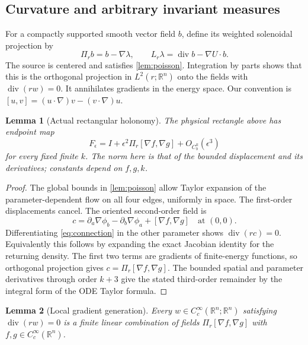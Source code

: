 \documentclass[11pt]{article}
\numberwithin{equation}{section}
\newtheorem{lemma}[lemma]{Lemma}
\theoremstyle{definition}
\newcommand{\R}{\mathbb R}
\newcommand{\Cc}{C_c^\infty}
\newcommand{\diver}{\operatorname{div}}
\begin{document}
\subsection{Curvature and arbitrary invariant measures}

For a compactly supported smooth vector field $b$, define its
weighted solenoidal projection by
\begin{equation}\label{eq:projection}
 \Pi_r b=b-\nabla\lambda,\qquad
 L_r\lambda=\diver b-\nabla U\cdot b .
\end{equation}
The source is centered and satisfies \cref{lem:poisson}.
Integration by parts shows that this is the orthogonal projection
in $L^2(r;\R^n)$ onto the fields with $\diver(rw)=0$.
It annihilates gradients in the energy space.
Our convention is $[u,v]=(u\cdot\nabla)v-(v\cdot\nabla)u$.

\begin{lemma}[Actual rectangular holonomy]\label{lem:rectangle}
The physical rectangle above has endpoint map
\begin{equation}\label{eq:rectangle}
 F_\epsilon=I+\epsilon^2\Pi_r[\nabla f,\nabla g]
                 +O_{C_b^k}(\epsilon^3)
\end{equation}
for every fixed finite $k$. The norm here is that of the bounded
displacement and its derivatives; constants depend on $f,g,k$.
\end{lemma}

\begin{proof}
The global bounds in \cref{lem:poisson} allow Taylor expansion of
the parameter-dependent flow on all four edges, uniformly in space.
The first-order displacements cancel. The oriented second-order
field is
\[
 c=\partial_a\nabla\phi_b-\partial_b\nabla\phi_a
                       +[\nabla f,\nabla g]\quad\text{at }(0,0).
\]
Differentiating \eqref{eq:connection} in the other parameter shows
$\diver(rc)=0$. Equivalently this follows by expanding the exact
Jacobian identity for the returning density. The first two terms
are gradients of finite-energy functions, so orthogonal projection
gives $c=\Pi_r[\nabla f,\nabla g]$.
The bounded spatial and parameter derivatives through order $k+3$
give the stated third-order remainder by the integral form of the
ODE Taylor formula.
\end{proof}

\begin{lemma}[Local gradient generation]\label{lem:brackets}
Every $w\in\Cc(\R^n;\R^n)$ satisfying $\diver(rw)=0$ is a finite
linear combination of fields $\Pi_r[\nabla f,\nabla g]$ with
$f,g\in\Cc(\R^n)$.
\end{lemma}
\end{document}
